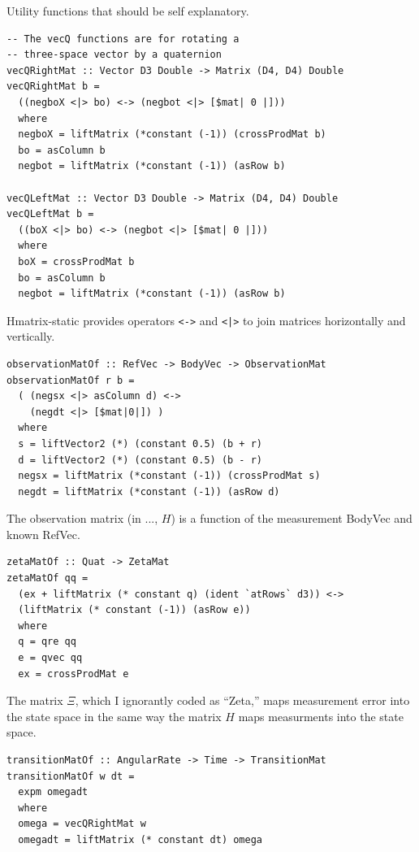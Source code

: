 \documentclass[12pt]{report}
\begin{document}
Utility functions that should be self explanatory.

\begin{lstlisting}
-- The vecQ functions are for rotating a 
-- three-space vector by a quaternion
vecQRightMat :: Vector D3 Double -> Matrix (D4, D4) Double
vecQRightMat b = 
  ((negboX <|> bo) <-> (negbot <|> [$mat| 0 |]))
  where 
  negboX = liftMatrix (*constant (-1)) (crossProdMat b)
  bo = asColumn b
  negbot = liftMatrix (*constant (-1)) (asRow b)

vecQLeftMat :: Vector D3 Double -> Matrix (D4, D4) Double
vecQLeftMat b = 
  ((boX <|> bo) <-> (negbot <|> [$mat| 0 |]))
  where 
  boX = crossProdMat b
  bo = asColumn b
  negbot = liftMatrix (*constant (-1)) (asRow b)
\end{lstlisting}

Hmatrix-static provides operators \lstinline$<->$ and \lstinline$<|>$ to join matrices horizontally and vertically.

\begin{lstlisting}
observationMatOf :: RefVec -> BodyVec -> ObservationMat
observationMatOf r b = 
  ( (negsx <|> asColumn d) <->
    (negdt <|> [$mat|0|]) )
  where 
  s = liftVector2 (*) (constant 0.5) (b + r)
  d = liftVector2 (*) (constant 0.5) (b - r)
  negsx = liftMatrix (*constant (-1)) (crossProdMat s)
  negdt = liftMatrix (*constant (-1)) (asRow d)
\end{lstlisting}

The observation matrix (in ..., $H$) is a function of the measurement BodyVec and known RefVec.

\begin{lstlisting}
zetaMatOf :: Quat -> ZetaMat
zetaMatOf qq = 
  (ex + liftMatrix (* constant q) (ident `atRows` d3)) <-> 
  (liftMatrix (* constant (-1)) (asRow e))
  where 
  q = qre qq
  e = qvec qq
  ex = crossProdMat e

\end{lstlisting}

The matrix $\Xi$, which I ignorantly coded as ``Zeta,'' maps measurement error into the state space in the same way the matrix $H$ maps measurments into the state space.

\begin{lstlisting}
transitionMatOf :: AngularRate -> Time -> TransitionMat
transitionMatOf w dt = 
  expm omegadt
  where 
  omega = vecQRightMat w
  omegadt = liftMatrix (* constant dt) omega

\end{lstlisting}
\end{document}
